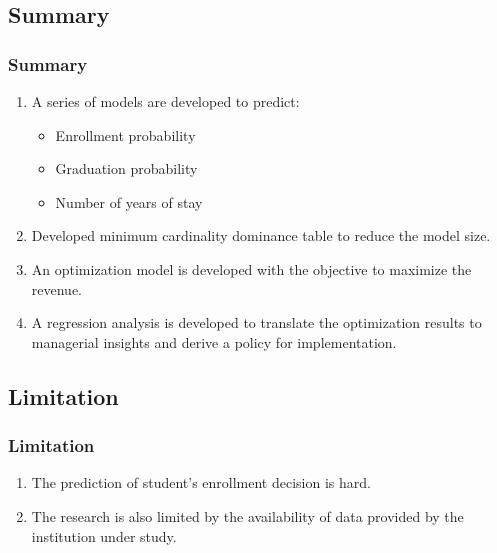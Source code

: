\documentclass[aspectratio=169]{beamer}
\begin{document}
\subsection{Summary}
\begin{frame}
\frametitle{Summary}
\begin{enumerate}
\item A series of models are developed to predict:
  \begin{itemize}
    \item Enrollment probability
    \item Graduation probability
    \item Number of years of stay
  \end{itemize}
\item Developed minimum cardinality dominance table to reduce the model size. 
\item An optimization model is developed with the objective to maximize the
revenue.
\item A regression analysis is developed to translate the optimization 
results to managerial insights and derive a policy for implementation.
\end{enumerate}
\end{frame}






\subsection{Limitation}
\begin{frame}
\frametitle{Limitation}
\begin{enumerate}

\item The prediction of student's enrollment decision is hard.
\item The research is also limited by the availability of 
data provided by the institution under study.
\end{enumerate}


\end{frame}
\end{document}
